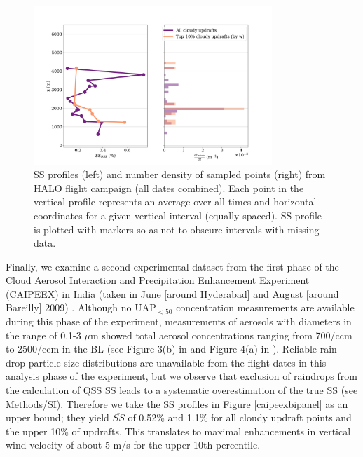 \documentclass{article}
\begin{document}

\begin{figure}[ht]
    \centering
    \includegraphics[width=9cm]{revhalo/v2_FINAL_combined_bipanel_ss_qss_vs_z_figure.png}
    \caption{SS profiles (left) and number density of sampled points (right) from HALO flight campaign (all dates combined). Each point in the vertical profile represents an average over all times and horizontal coordinates for a given vertical interval (equally-spaced). SS profile is plotted with markers so as not to obscure intervals with missing data.}
    \label{halobipanel}
\end{figure}

Finally, we examine a second experimental dataset from the first phase of the Cloud Aerosol Interaction and Precipitation Enhancement Experiment (CAIPEEX) in India (taken in June [around Hyderabad] and August [around Bareilly] 2009) \cite{Kulkarni2012}. Although no UAP$_{<50}$ concentration measurements are available during this phase of the experiment, measurements of aerosols with diameters in the range of 0.1-3 $\mu$m showed total aerosol concentrations ranging from 700/ccm to 2500/ccm in the BL (see Figure 3(b) in \cite{Prabha2011} and Figure 4(a) in \cite{Kulkarni2012}). Reliable rain drop particle size distributions are unavailable from the flight dates in this analysis phase of the experiment, but we observe that exclusion of raindrops from the calculation of QSS SS leads to a systematic overestimation of the true SS (see Methods/SI). Therefore we take the SS profiles in Figure \ref{caipeexbipanel} as an upper bound; they yield $\overline{SS}$ of 0.52\% and 1.1\% for all cloudy updraft points and the upper 10\% of updrafts. This translates to maximal enhancements in vertical wind velocity of about 5 m/s for the upper 10th percentile.
\end{document}
